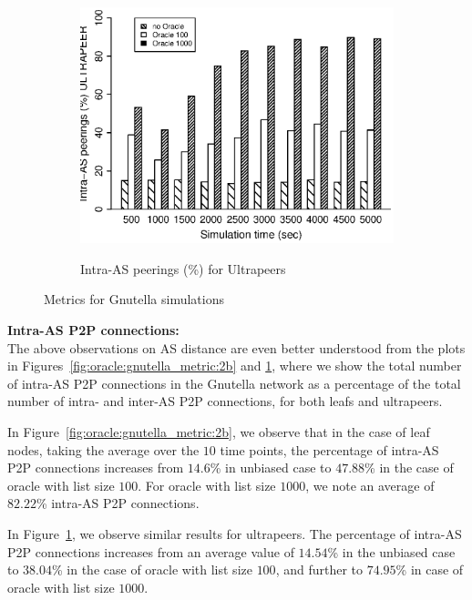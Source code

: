 \begin{figure}[tbp]
\begin{subfigure}[]{0.32\linewidth}
    {\includegraphics[width=1\textwidth]{figures/intraAS-up.eps}}
    \caption{Intra-AS peerings (\%) for Ultrapeers\label{fig:oracle:gnutella_metric:2c}}
    \end{subfigure}
    \caption{Metrics for Gnutella simulations}
   \label{fig:oracle:gnutella_metric}
\end{figure}


\vspace{0.75\baselineskip}
\noindent\textbf{Intra-AS P2P connections:} \\
The above observations on AS distance are even better understood from the plots in
Figures~\ref{fig:oracle:gnutella_metric:2b} and \ref{fig:oracle:gnutella_metric:2c}, where we show the total number of intra-AS
P2P connections in the Gnutella network as a percentage of the total number of intra- and
inter-AS P2P connections, for both leafs and ultrapeers.

In Figure~\ref{fig:oracle:gnutella_metric:2b}, we observe that in the case of leaf nodes, taking
the average over the $10$ time points, the percentage of intra-AS P2P connections
increases from $14.6$\% in unbiased case to $47.88$\% in the case of oracle with list size
$100$. For oracle with list size $1000$, we note an average of $82.22$\% intra-AS P2P
connections.

In Figure~\ref{fig:oracle:gnutella_metric:2c}, we observe similar results for ultrapeers. The
percentage of intra-AS P2P connections increases from an average value of $14.54$\% in the
unbiased case to $38.04$\% in the case of oracle with list size $100$, and further to
$74.95$\% in case of oracle with list size $1000$.

